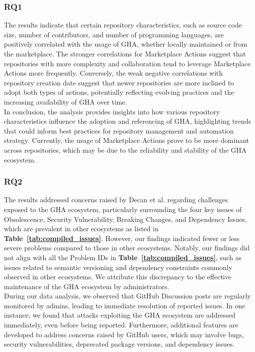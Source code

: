 \documentclass[conference]{IEEEtran}
\begin{document}
\subsubsection{\textbf{RQ1}} The results indicate that certain repository characteristics, such as source code size, number of contributors, and number of programming languages, are positively correlated with the usage of GHA, whether locally maintained or from the marketplace. The stronger correlations for Marketplace Actions suggest that repositories with more complexity and collaboration tend to leverage Marketplace Actions more frequently. Conversely, the weak negative correlations with repository creation date suggest that newer repositories are more inclined to adopt both types of actions, potentially reflecting evolving practices and the increasing availability of GHA over time.\\ 
      In conclusion, the analysis provides insights into how various repository characteristics influence the adoption and referencing of GHA, highlighting trends that could inform best practices for repository management and automation strategy. Currently, the usage of Marketplace Actions prove to be more dominant across repositories, which may be due to the reliability and stability of the GHA ecosystem.\\

\subsubsection{\textbf{RQ2}} The results addressed concerns raised by Decan et al. \cite{decan2022use} regarding challenges exposed to the GHA ecosystem, particularly surrounding the four key issues of Obsolescence, Security Vulnerability, Breaking Changes, and Dependency Issues, which are prevalent in other ecosystems as listed in \textbf{Table~\ref{tab:compiled_issues}}. However, our findings indicated fewer or less severe problems compared to those in other ecosystems. Notably, our findings did not align with all the Problem IDs in \textbf{Table~\ref{tab:compiled_issues}}, such as issues related to semantic versioning and dependency constraints commonly observed in other ecosystems. We attribute this discrepancy to the effective maintenance of the GHA ecosystem by administrators.\\
	During our data analysis, we observed that GitHub Discussion posts are regularly monitored by admins, leading to immediate resolution of reported issues. In one instance, we found that attacks exploiting the GHA ecosystem are addressed immediately, even before being reported. Furthermore, additional features are developed to address concerns raised by GitHub users, which may involve bugs, security vulnerabilities, deprecated package versions, and dependency issues.
\end{document}

